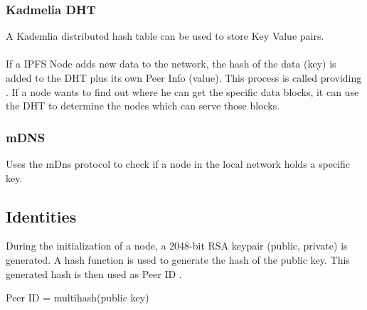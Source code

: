 \documentclass[a4paper,11pt, oneside]{report}
\theoremstyle{definition}
\begin{document}
\subsubsection{Kadmelia DHT}
A Kademlia distributed hash table can be used to store Key Value pairs.\\ \\
If a IPFS Node adds new data to the network, the hash of the data (key) is added to the DHT plus its own Peer Info (value). This process is called providing \cite{dht-provide}. If a node wants to find out where he can get the specific data blocks, it can use the DHT to determine the nodes which can serve those blocks.

\subsubsection{mDNS}
Uses the mDns protocol to check if a node in the local network holds a specific key.

\newpage
\subsection{Identities}
During the initialization of a node, a 2048-bit RSA keypair (public, private) is generated. A hash function is used to generate the hash of the public key. This generated hash is then used as Peer ID \cite{PeerID}.
\begin{center}
Peer ID = multihash(public key)
\end{center}
\end{document}

